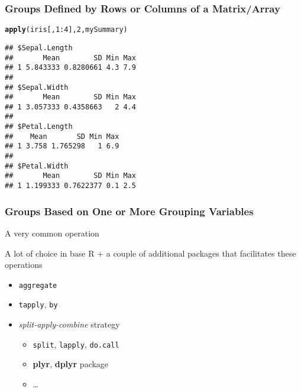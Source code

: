 \documentclass[paper=screen,mathserif]{beamer}\usepackage[]{graphicx}\usepackage[]{color}
\makeatletter
\newcommand{\hlnum}[1]{\textcolor[rgb]{0.686,0.059,0.569}{#1}}%
\newcommand{\hlopt}[1]{\textcolor[rgb]{0,0,0}{#1}}%
\newcommand{\hlstd}[1]{\textcolor[rgb]{0.345,0.345,0.345}{#1}}%
\newcommand{\hlkwd}[1]{\textcolor[rgb]{0.737,0.353,0.396}{\textbf{#1}}}%
\newenvironment{kframe}{%
 \def\at@end@of@kframe{}%
 \ifinner\ifhmode%
  \def\at@end@of@kframe{\end{minipage}}%
  \begin{minipage}{\columnwidth}%
 \fi\fi%
 \def\FrameCommand##1{\hskip\@totalleftmargin \hskip-\fboxsep
 \colorbox{shadecolor}{##1}\hskip-\fboxsep
     \hskip-\linewidth \hskip-\@totalleftmargin \hskip\columnwidth}%
 \MakeFramed {\advance\hsize-\width
   \@totalleftmargin\z@ \linewidth\hsize
   \@setminipage}}%
 {\par\unskip\endMakeFramed%
 \at@end@of@kframe}
\newenvironment{knitrout}{}{} %
\newcommand{\ft}[1]{\frametitle{#1}}
\makeatother
\begin{document}
\begin{frame}[fragile]
  \ft{Groups Defined by Rows or Columns of a Matrix/Array}

\begin{knitrout}\scriptsize
{}\color{fgcolor}\begin{kframe}
\begin{alltt}
\hlkwd{apply}\hlstd{(iris[,} \hlnum{1}\hlopt{:}\hlnum{4}\hlstd{],} \hlnum{2}\hlstd{, mySummary)}
\end{alltt}
\begin{verbatim}
## $Sepal.Length
##       Mean        SD Min Max
## 1 5.843333 0.8280661 4.3 7.9
## 
## $Sepal.Width
##       Mean        SD Min Max
## 1 3.057333 0.4358663   2 4.4
## 
## $Petal.Length
##    Mean       SD Min Max
## 1 3.758 1.765298   1 6.9
## 
## $Petal.Width
##       Mean        SD Min Max
## 1 1.199333 0.7622377 0.1 2.5
\end{verbatim}
\end{kframe}
\end{knitrout}

\end{frame}

\begin{frame}[fragile]
  \ft{Groups Based on One or More Grouping Variables}
  
  A very common operation
  
  A lot of choice in base R + a couple of additional packages that
  facilitates these operations
  
  \begin{itemize}
  \item \verb=aggregate=
  \item \verb=tapply=, \verb=by=
  \item {\em split-apply-combine} strategy
    \begin{itemize}
    \item \verb=split=, \verb=lapply=, \verb=do.call=
    \item {\bf plyr}, {\bf dplyr} package
    \item \dots
    \end{itemize}

  \end{itemize}
\end{frame}
\end{document}
